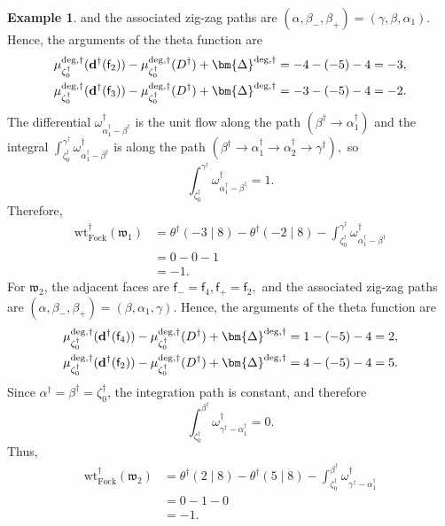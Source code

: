 \documentclass[12pt]{amsart}
\numberwithin{equation}{section}
\theoremstyle{definition}
\newtheorem{example}[theorem]{Example}
\newcommand{\wt}{\mathrm{wt}}
\def\divisor{D}
\def\trop{\dagger}
\def\bface{\mathsf{f}}
\def\dam{{\bf d}}
\def\divisor{D}
\def\vecRC{\bm{\Delta}}
\def\ptSig{\zeta}
\def\baseptT{{\ptSig_0^\trop}}
\begin{document}
\begin{example}
\)
and the associated zig-zag paths are
\(
(\alpha,\beta_-,\beta_+)
=
(\gamma,\beta,\alpha_1).
\)
Hence, the arguments of the theta function are
\[
\begin{aligned}
\mu_{\baseptT}^{\mathrm{deg},\trop}
(\dam^\trop(\bface_2))
-\mu^{\mathrm{deg},\trop}_\baseptT(\divisor^\trop)
+\vecRC^{\mathrm{deg},\trop}
&=
-4-(-5)-4
=
-3,
\\
\mu_{\baseptT}^{\mathrm{deg},\trop}
(\dam^\trop(\bface_3))
-\mu^{\mathrm{deg},\trop}_\baseptT(\divisor^\trop)
+\vecRC^{\mathrm{deg},\trop}
&=
-3-(-5)-4
=
-2.
\end{aligned}
\]
The differential
$
\omega_{\alpha_1^\trop-\beta^\trop}^\trop
$
is the unit flow along the path
$
(\beta^\trop
\rightarrow
\alpha_1^\trop)
$
and the integral $\int_{\baseptT}^{\gamma^\trop}\omega_{\alpha_1^\trop-\beta^\trop}^\trop$ is along the path 
\(
(\beta^\trop
\rightarrow
\alpha_1^\trop
\rightarrow
\alpha_2^\trop
\rightarrow
\gamma^\trop),
\)
so
\[
\int_\baseptT^{\gamma^\trop}
\omega_{\alpha_1^\trop-\beta^\trop}^\trop
=
1.
\]
Therefore,
\[
\begin{aligned}
\wt_{\mathrm{Fock}}^\trop(\mathfrak w_1)
&=
\theta^\trop(-3\mid8)
-
\theta^\trop(-2\mid8)
-
\int_\baseptT^{\gamma^\trop}
\omega_{\alpha_1^\trop-\beta^\trop}^\trop
\\
&=
0-0-1
\\
&=
-1.
\end{aligned}
\]
For $\mathfrak w_2$, the adjacent faces are
\(
\bface_-=\bface_4,
\bface_+=\bface_2,
\)
and the associated zig-zag paths are
\(
(\alpha,\beta_-,\beta_+)
=
(\beta,\alpha_1,\gamma).
\)
Hence, the arguments of the theta function are
\[
\begin{aligned}
\mu_{\baseptT}^{\mathrm{deg},\trop}
(\dam^\trop(\bface_4))
-\mu^{\mathrm{deg},\trop}_\baseptT(\divisor^\trop)
+\vecRC^{\mathrm{deg},\trop}
&=
1-(-5)-4
=
2,
\\
\mu_{\baseptT}^{\mathrm{deg},\trop}
(\dam^\trop(\bface_2))
-\mu^{\mathrm{deg},\trop}_\baseptT(\divisor^\trop)
+\vecRC^{\mathrm{deg},\trop}
&=
4-(-5)-4
=
5.
\end{aligned}
\]
Since $\alpha^\trop=\beta^\trop=\baseptT$, the integration path is constant, and
therefore
\[
\int_{\baseptT}^{\beta^\trop}
\omega_{\gamma^\trop-\alpha_1^\trop}^\trop
=
0.
\]
Thus,
\[
\begin{aligned}
\wt_{\mathrm{Fock}}^\trop(\mathfrak w_2)
&=
\theta^\trop(2\mid8)
-
\theta^\trop(5\mid8)
-
\int_{\baseptT}^{\beta^\trop}
\omega_{\gamma^\trop-\alpha_1^\trop}^\trop
\\
&=
0-1-0
\\
&=
-1.
\end{aligned}
\]


\end{example}
\end{document}
